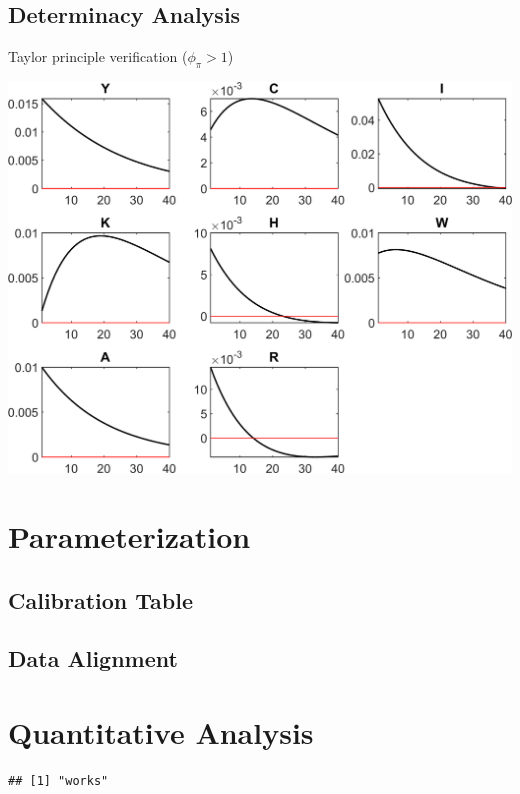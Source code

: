 \documentclass[11pt,preprint]{elsarticle}
\let\origfigure\figure
\let\endorigfigure\endfigure
\renewenvironment{figure}[1][2] {
    \expandafter\origfigure\expandafter[H]
} {
    \endorigfigure
}
\numberwithin{equation}{section}
\numberwithin{figure}{section}
\numberwithin{table}{section}
\begin{document}
\subsection{Determinacy Analysis}\label{determinacy-analysis}

Taylor principle verification (\(\phi_\pi > 1\))

\begin{figure}
\centering
\includegraphics{code/rbc_model/rbc_model/graphs/rbc_model_IRF_eps_cropped.png}
\caption{image}
\end{figure}

\section{Parameterization}\label{parameterization}

\subsection{Calibration Table}\label{calibration-table}

\subsection{Data Alignment}\label{data-alignment}

\section{Quantitative Analysis}\label{quantitative-analysis}

\begin{verbatim}
## [1] "works"
\end{verbatim}
\end{document}

